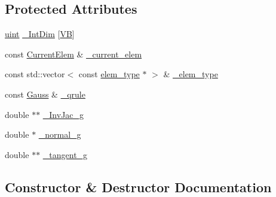 \subsection*{Protected Attributes}
\begin{DoxyCompactItemize}
\item 
\mbox{\hyperlink{_typedefs_8hpp_a91ad9478d81a7aaf2593e8d9c3d06a14}{uint}} \mbox{\hyperlink{classfemus_1_1_current_gauss_point_base_af3453fd371041d38eecf683ed31780b8}{\+\_\+\+Int\+Dim}} \mbox{[}\mbox{\hyperlink{_v_b_type_enum_8hpp_a02ebcbc55b174d8bb6a65cddbe7f90b6}{VB}}\mbox{]}
\item 
const \mbox{\hyperlink{classfemus_1_1_current_elem}{Current\+Elem}} \& \mbox{\hyperlink{classfemus_1_1_current_gauss_point_base_a8e74a49e2a79f39e0e38b22c2c17f893}{\+\_\+current\+\_\+elem}}
\item 
const std\+::vector$<$ const \mbox{\hyperlink{classfemus_1_1elem__type}{elem\+\_\+type}} $\ast$ $>$ \& \mbox{\hyperlink{classfemus_1_1_current_gauss_point_base_ac04dc6fcc6b32db55273e01fa4d4a6f4}{\+\_\+elem\+\_\+type}}
\item 
const \mbox{\hyperlink{classfemus_1_1_gauss}{Gauss}} \& \mbox{\hyperlink{classfemus_1_1_current_gauss_point_base_a2d4d7be4478a1aea5bfa924c412bf29f}{\+\_\+qrule}}
\item 
double $\ast$$\ast$ \mbox{\hyperlink{classfemus_1_1_current_gauss_point_base_a38c6b21bd7028fa2e75189c9619ca081}{\+\_\+\+Inv\+Jac\+\_\+g}}
\item 
double $\ast$ \mbox{\hyperlink{classfemus_1_1_current_gauss_point_base_a53720924e866af56f3dd74519fdc42a0}{\+\_\+normal\+\_\+g}}
\item 
double $\ast$$\ast$ \mbox{\hyperlink{classfemus_1_1_current_gauss_point_base_a0272bf13da6d3f348229bf6ae498034f}{\+\_\+tangent\+\_\+g}}
\end{DoxyCompactItemize}


\subsection{Constructor \& Destructor Documentation}
\mbox{\label{classfemus_1_1_current_gauss_point_base_aee804d2e69ceec8dbca20be1485a5c14}} 

